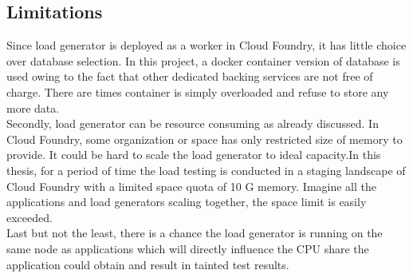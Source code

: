 \subsection{Limitations}
Since load generator is deployed as a worker in Cloud Foundry, it has little choice over database selection. In this project, a docker container version of database is used owing to the fact that other dedicated backing services are not free of charge. There are times container is simply overloaded and refuse to store any more data. \\
Secondly, load generator can be resource consuming as already discussed. In Cloud Foundry, some organization or space has only restricted size of memory to provide. It could be hard to scale the load generator to ideal capacity.In this thesis, for a period of time the load testing is conducted in a staging landscape of Cloud Foundry with a limited space quota of 10 G memory. Imagine all the applications and load generators scaling together, the space limit is easily exceeded. \\
Last but not the least, there is a chance the load generator is running on the same node as applications which will directly influence the CPU share the application could obtain and result in tainted test results. 

